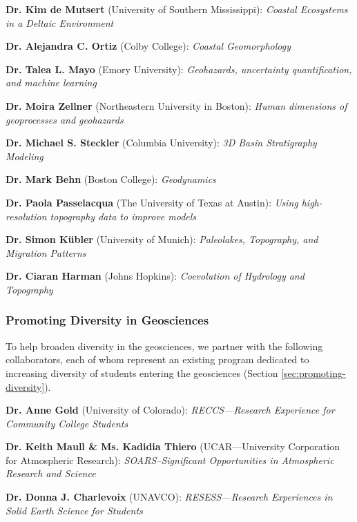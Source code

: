 \begin{compactitem}
\item \textbf{Dr. Kim de Mutsert} (University of Southern Mississippi): \textit{Coastal Ecosystems in a Deltaic Environment}

\item \textbf{Dr. Alejandra C. Ortiz} (Colby College): \textit{Coastal Geomorphology}

\item \textbf{Dr. Talea L. Mayo} (Emory University): \textit{Geohazards, uncertainty quantification, and machine learning}

\item \textbf{Dr. Moira Zellner} (Northeastern University in Boston): \textit{Human dimensions of geoprocesses and geohazards}

\item \textbf{Dr. Michael S. Steckler} (Columbia University): \textit{3D Basin Stratigraphy Modeling}

\item \textbf{Dr. Mark Behn} (Boston College): \textit{Geodynamics}

\item \textbf{Dr. Paola Passelacqua} (The University of Texas at Austin): \textit{Using high-resolution topography data to improve models}

\item \textbf{Dr. Simon K\"ubler} (University of Munich): \textit{Paleolakes, Topography, and Migration Patterns}

\item \textbf{Dr. Ciaran Harman} (Johns Hopkins): \textit{Coevolution of Hydrology and Topography}

\end{compactitem}


\subsubsection*{Promoting Diversity in Geosciences}

To help broaden diversity in the geosciences, we partner with the following
collaborators, each of whom represent an existing program dedicated to
increasing diversity of students entering the geosciences (Section \ref{sec:promoting-diversity}).

\begin{compactitem}
\item \textbf{Dr. Anne Gold} (University of Colorado): \textit{RECCS---Research Experience for Community College Students}

\item \textbf{Dr. Keith Maull \& Ms. Kadidia Thiero} (UCAR---University Corporation for Atmospheric Research): \textit{SOARS--Significant Opportunities in Atmospheric Research and Science}

\item \textbf{Dr. Donna J. Charlevoix} (UNAVCO): \textit{RESESS---Research Experiences in Solid Earth Science for Students}

\end{compactitem}


